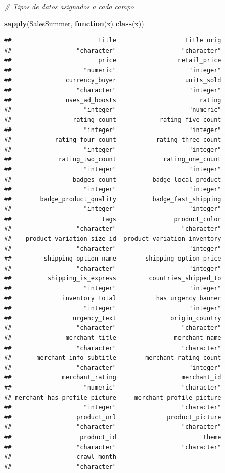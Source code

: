 \documentclass[
]{article}
\newenvironment{Shaded}{\begin{snugshade}}{\end{snugshade}}
\newcommand{\CommentTok}[1]{\textcolor[rgb]{0.56,0.35,0.01}{\textit{#1}}}
\newcommand{\ControlFlowTok}[1]{\textcolor[rgb]{0.13,0.29,0.53}{\textbf{#1}}}
\newcommand{\KeywordTok}[1]{\textcolor[rgb]{0.13,0.29,0.53}{\textbf{#1}}}
\newcommand{\NormalTok}[1]{#1}
\begin{document}
\begin{Shaded}
\begin{Highlighting}[]
\CommentTok{# Tipos de datos asignados a cada campo}

\KeywordTok{sapply}\NormalTok{(SalesSummer, }\ControlFlowTok{function}\NormalTok{(x) }\KeywordTok{class}\NormalTok{(x))}
\end{Highlighting}
\end{Shaded}

\begin{verbatim}
##                        title                   title_orig 
##                  "character"                  "character" 
##                        price                 retail_price 
##                    "numeric"                    "integer" 
##               currency_buyer                   units_sold 
##                  "character"                    "integer" 
##               uses_ad_boosts                       rating 
##                    "integer"                    "numeric" 
##                 rating_count            rating_five_count 
##                    "integer"                    "integer" 
##            rating_four_count           rating_three_count 
##                    "integer"                    "integer" 
##             rating_two_count             rating_one_count 
##                    "integer"                    "integer" 
##                 badges_count          badge_local_product 
##                    "integer"                    "integer" 
##        badge_product_quality          badge_fast_shipping 
##                    "integer"                    "integer" 
##                         tags                product_color 
##                  "character"                  "character" 
##    product_variation_size_id  product_variation_inventory 
##                  "character"                    "integer" 
##         shipping_option_name        shipping_option_price 
##                  "character"                    "integer" 
##          shipping_is_express         countries_shipped_to 
##                    "integer"                    "integer" 
##              inventory_total           has_urgency_banner 
##                    "integer"                    "integer" 
##                 urgency_text               origin_country 
##                  "character"                  "character" 
##               merchant_title                merchant_name 
##                  "character"                  "character" 
##       merchant_info_subtitle        merchant_rating_count 
##                  "character"                    "integer" 
##              merchant_rating                  merchant_id 
##                    "numeric"                  "character" 
## merchant_has_profile_picture     merchant_profile_picture 
##                    "integer"                  "character" 
##                  product_url              product_picture 
##                  "character"                  "character" 
##                   product_id                        theme 
##                  "character"                  "character" 
##                  crawl_month 
##                  "character"
\end{verbatim}
\end{document}
